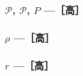 
\subsubsection*{$\mathscr{P}$, $\mathcal{P}$, $P$ ---［高］}

\subsubsection*{$\rho$ ---［高］}

\subsubsection*{$r$ ---［高］}

